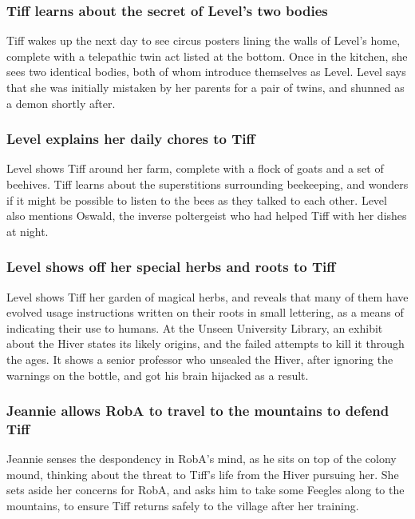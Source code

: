 \subsubsection{\Gls{Tiff} learns about the secret of \Gls{Level}'s two bodies}
\Gls{Tiff} wakes up the next day to see circus posters lining the walls of \Gls{Level}'s home,
complete with a telepathic twin act listed at the bottom. Once in the kitchen, she sees two
identical bodies, both of whom introduce themselves as \Gls{Level}. \Gls{Level} says that she was
initially mistaken by her parents for a pair of twins, and shunned as a demon shortly after.

\subsubsection{\Gls{Level} explains her daily chores to \Gls{Tiff}}
\Gls{Level} shows \Gls{Tiff} around her farm, complete with a flock of goats and a set of beehives.
\Gls{Tiff} learns about the superstitions surrounding beekeeping, and wonders if it might be
possible to listen to the bees as they talked to each other. \Gls{Level} also mentions \Gls{Oswald},
the inverse poltergeist who had helped \Gls{Tiff} with her dishes at night.

\subsubsection{\Gls{Level} shows off her special herbs and roots to \Gls{Tiff}}
\Gls{Level} shows \Gls{Tiff} her garden of magical herbs, and reveals that many of them have
evolved usage instructions written on their roots in small lettering, as a means of indicating their
use to humans. At the Unseen University Library, an exhibit about the \Gls{Hiver} states its likely
origins, and the failed attempts to kill it through the ages. It shows a senior professor who
unsealed the \Gls{Hiver}, after ignoring the warnings on the bottle, and got his brain hijacked as
a result.

\subsubsection{\Gls{Jeannie} allows \Gls{RobA} to travel to the mountains to defend \Gls{Tiff}}
\Gls{Jeannie} senses the despondency in \Gls{RobA}'s mind, as he sits on top of the colony mound,
thinking about the threat to \Gls{Tiff}'s life from the \Gls{Hiver} pursuing her. She sets aside
her concerns for \Gls{RobA}, and asks him to take some Feegles along to the mountains, to ensure
\Gls{Tiff} returns safely to the village after her training.


